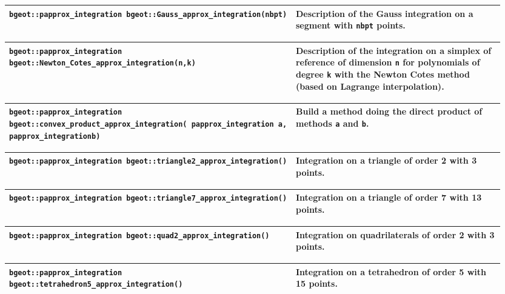 \begin{center} \begin{tabular}{|m{0.55\linewidth}|m{0.4\linewidth}|} \hline
{\tt bgeot::papprox\_integration bgeot::Gauss\_approx\_integration(nbpt)} & Description of the Gauss integration on a segment with {\tt nbpt} points. \\ \hline
\end{tabular}  
\begin{tabular}{|m{0.55\linewidth}|m{0.4\linewidth}|} \hline
{\tt bgeot::papprox\_integration bgeot::Newton\_Cotes\_approx\_integration(n,\;k)} & Description of the integration on a simplex of reference of dimension {\tt n} for polynomials of degree {\tt k} with the Newton Cotes method (based on Lagrange interpolation).\\ \hline
\end{tabular}  
\begin{tabular}{|m{0.55\linewidth}|m{0.4\linewidth}|} \hline
{\tt bgeot::papprox\_integration bgeot::convex\_product\_approx\_integration( papprox\_integration a, papprox\_integration\;b)} & Build a method doing the direct product of methods {\tt a} and {\tt b}. \\ \hline
\end{tabular}  
\begin{tabular}{|m{0.55\linewidth}|m{0.4\linewidth}|} \hline
{\tt bgeot::papprox\_integration bgeot::triangle2\_approx\_integration()} & Integration on a triangle of order 2 with 3 points. \\ \hline
\end{tabular}
\begin{tabular}{|m{0.55\linewidth}|m{0.4\linewidth}|} \hline
{\tt bgeot::papprox\_integration bgeot::triangle7\_approx\_integration()} & Integration on a triangle of order 7 with 13 points. \\ \hline
\end{tabular} 
\begin{tabular}{|m{0.55\linewidth}|m{0.4\linewidth}|} \hline
{\tt bgeot::papprox\_integration bgeot::quad2\_approx\_integration()} & Integration on quadrilaterals of order 2 with 3 points. \\ \hline
\end{tabular}
\begin{tabular}{|m{0.55\linewidth}|m{0.4\linewidth}|} \hline
{\tt bgeot::papprox\_integration bgeot::tetrahedron5\_approx\_integration()} & Integration on a tetrahedron of order 5 with 15 points. \\ \hline
\end{tabular} \end{center}
